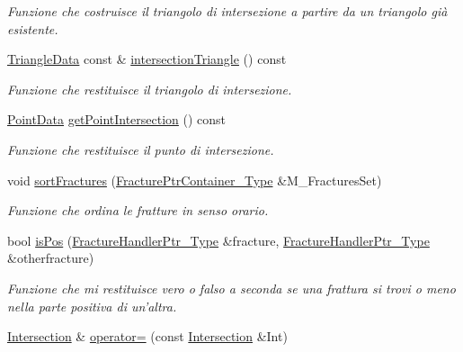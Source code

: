 \begin{DoxyCompactItemize}
\begin{DoxyCompactList}\small\item\em Funzione che costruisce il triangolo di intersezione a partire da un triangolo già esistente. \end{DoxyCompactList}\item 
\hyperlink{classTriangleData}{Triangle\-Data} const \& \hyperlink{classIntersection_a603d1cb4b33762c72999968ceec95a39}{intersection\-Triangle} () const 
\begin{DoxyCompactList}\small\item\em Funzione che restituisce il triangolo di intersezione. \end{DoxyCompactList}\item 
\hyperlink{classPointData}{Point\-Data} \hyperlink{classIntersection_abfa3de3a738c4fd36c54eaeecc3557de}{get\-Point\-Intersection} () const 
\begin{DoxyCompactList}\small\item\em Funzione che restituisce il punto di intersezione. \end{DoxyCompactList}\item 
void \hyperlink{classIntersection_ab3bd72c81dc261d3035213e5cefbb1c5}{sort\-Fractures} (\hyperlink{FractureHandler_8h_a2f0b57e18ecf89912d7de0c87158009e}{Fracture\-Ptr\-Container\-\_\-\-Type} \&M\-\_\-\-Fractures\-Set)
\begin{DoxyCompactList}\small\item\em Funzione che ordina le fratture in senso orario. \end{DoxyCompactList}\item 
bool \hyperlink{classIntersection_a9acd54dacf9de3c21fb37df24cb47d06}{is\-Pos} (\hyperlink{FractureHandler_8h_af23fb7a30aaff864bd42587af4f1e78a}{Fracture\-Handler\-Ptr\-\_\-\-Type} \&fracture, \hyperlink{FractureHandler_8h_af23fb7a30aaff864bd42587af4f1e78a}{Fracture\-Handler\-Ptr\-\_\-\-Type} \&otherfracture)
\begin{DoxyCompactList}\small\item\em Funzione che mi restituisce vero o falso a seconda se una frattura si trovi o meno nella parte positiva di un'altra. \end{DoxyCompactList}\item 
\hyperlink{classIntersection}{Intersection} \& \hyperlink{classIntersection_a8cc823fe1b873994d49bc46b3b4136ef}{operator=} (const \hyperlink{classIntersection}{Intersection} \&Int)
\end{DoxyCompactItemize}


